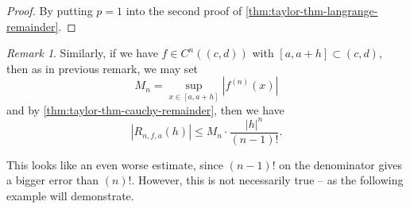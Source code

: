 \documentclass[11pt]{article}
\numberwithin{equation}{section}
\theoremstyle{definition}
\theoremstyle{remark}
\newtheorem{remark}[theorem]{Remark}
\newcommand{\pqty}[1]{\left(#1\right)}
\newcommand{\abs}[1]{\left|#1\right|}
\newcommand{\ccintv}[2]{[#1,#2]}
\newcommand{\oointv}[2]{(#1,#2)}
\newcommand{\contClass}[1]{C^{#1}}
\begin{document}
\begin{proof}
    By putting \(p = 1\) into the second proof of \autoref{thm:taylor-thm-langrange-remainder}.
\end{proof}

\begin{remark}\label{analysis-unit-0131}
    Similarly, if we have \(f \in \contClass{n} \pqty{\oointv{c}{d}}\) with \(\ccintv{a}{a + h} \subset \oointv{c}{d}\), then as in previous remark, we may set
    \[
        M_n = \sup_{x \in \ccintv{a}{a + h}} \abs{f^{\pqty{n}} \pqty{x}}
    \]
    and by \autoref{thm:taylor-thm-cauchy-remainder}, then we have
    \[
        \abs{R_{n, f, a} \pqty{h}} \leq M_n \cdot \frac{\abs{h}^n}{\pqty{n - 1}!}.
    \]
\end{remark}

This looks like an even worse estimate, since \(\pqty{n - 1}!\) on the denominator gives a bigger error than \(\pqty{n}!\). However, this is not necessarily true -- as the following example will demonstrate.
\end{document}
